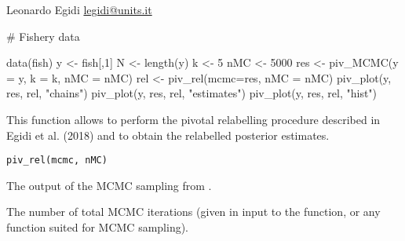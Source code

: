 \documentclass[a4paper]{book}
\begin{document}
%
\begin{Author}\relax
Leonardo Egidi \url{legidi@units.it}
\end{Author}
%
\begin{Examples}
\begin{ExampleCode}

# Fishery data

data(fish)
y <- fish[,1]
N <- length(y)
k <- 5
nMC <- 5000
res <- piv_MCMC(y = y, k = k, nMC = nMC)
rel <- piv_rel(mcmc=res, nMC = nMC)
piv_plot(y, res, rel, "chains")
piv_plot(y, res, rel, "estimates")
piv_plot(y, res, rel, "hist")

\end{ExampleCode}
\end{Examples}
%
\begin{Description}\relax
This function allows to perform the pivotal relabelling procedure described in Egidi et al. (2018) and to obtain the relabelled posterior estimates.
\end{Description}
%
\begin{Usage}
\begin{verbatim}
piv_rel(mcmc, nMC)
\end{verbatim}
\end{Usage}
%
\begin{Arguments}
\begin{ldescription}
\item[\code{mcmc}] The output of the MCMC sampling from .

\item[\code{nMC}] The number of total MCMC iterations (given in input to the  function, or any function suited for MCMC sampling).
\end{ldescription}
\end{Arguments}
%
\end{document}
